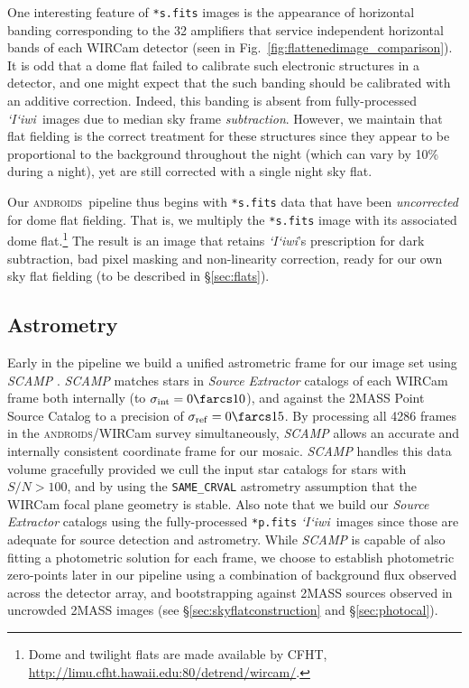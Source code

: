 \documentclass[iop,tighten]{emulateapj}
\newcommand{\sw}[1]{\textit{#1}} %
\newcommand{\iiwione}{\sw{`I`iwi}}
\newcommand{\androids}{\textsc{androids}}
\newcommand{\Fig}[1]{Fig.~\ref{fig:#1}}  %
\newcommand{\Sec}[1]{\S\ref{sec:#1}}  %
\begin{document}
One interesting feature of \texttt{*s.fits} images is the appearance of horizontal banding corresponding to the 32 amplifiers that service independent horizontal bands of each WIRCam detector (seen in \Fig{flattenedimage_comparison}).
It is odd that a dome flat failed to calibrate such electronic structures in a detector, and one might expect that the such banding should be calibrated with an additive correction.
Indeed, this banding is absent from fully-processed \iiwione\ images due to median sky frame \textit{subtraction}.
However, we maintain that flat fielding is the correct treatment for these structures since they appear to be proportional to the background throughout the night (which can vary by 10\% during a night), yet are still corrected with a single night sky flat.

Our \androids\ pipeline thus begins with \texttt{*s.fits} data that have been \textit{uncorrected} for dome flat fielding.
That is, we multiply the \texttt{*s.fits} image with its associated dome flat.\footnote{Dome and twilight flats are made available by CFHT, \url{http://limu.cfht.hawaii.edu:80/detrend/wircam/}.}
The result is an image that retains \iiwione's prescription for dark subtraction, bad pixel masking and non-linearity correction, ready for our own sky flat fielding (to be described in \Sec{flats}).

\subsection{Astrometry}

Early in the pipeline we build a unified astrometric frame for our image set using \sw{SCAMP} \citep{Bertin:2006}.
\sw{SCAMP} matches stars in \sw{Source Extractor} \citep{Bertin:1996} catalogs of each WIRCam frame both internally (to $\sigma_\mathrm{int}=0\farcs 10$), and against the 2MASS Point Source Catalog \citep{Skrutskie:2006} to a precision of $\sigma_\mathrm{ref}=0 \farcs 15$.
By processing all 4286 frames in the \androids /WIRCam survey simultaneously, \sw{SCAMP} allows an accurate and internally consistent coordinate frame for our mosaic.
\sw{SCAMP} handles this data volume gracefully provided we cull the input star catalogs for stars with $S/N > 100$, and by using the \texttt{SAME\_CRVAL} astrometry assumption that the WIRCam focal plane geometry is stable.
Also note that we build our \sw{Source Extractor} catalogs using the fully-processed \texttt{*p.fits} \iiwione\ images since those are adequate for source detection and astrometry.
While \sw{SCAMP} is capable of also fitting a photometric solution for each frame, we choose to establish photometric zero-points later in our pipeline using a combination of background flux observed across the detector array, and bootstrapping against 2MASS sources observed in uncrowded 2MASS images (see \Sec{skyflatconstruction} and \Sec{photocal}).
\end{document}
